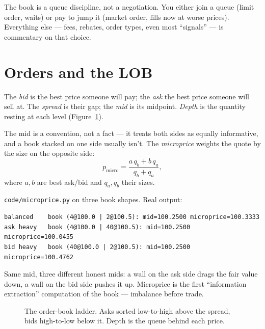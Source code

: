 The book is a queue discipline, not a negotiation. You either join a
queue (limit order, waits) or pay to jump it (market order, fills
now at worse prices). Everything else --- fees, rebates, order
types, even most ``signals'' --- is commentary on that choice.

\section{Orders and the LOB}\label{sec:orders}
The \emph{bid} is the best price someone will pay; the \emph{ask}
the best price someone will sell at. The \emph{spread} is their gap;
the \emph{mid} is its midpoint. \emph{Depth} is the quantity resting
at each level (Figure~\ref{fig:ladder}).

The mid is a convention, not a fact --- it treats both sides as
equally informative, and a book stacked on one side usually isn't.
The \emph{microprice} weights the quote by the size on the opposite
side:
\[
p_{\text{micro}}=\frac{a\,q_b + b\,q_a}{q_b+q_a},
\]
where $a,b$ are best ask/bid and $q_a,q_b$ their sizes.

\begin{example}\label{ex:microprice}
\texttt{code/microprice.py} on three book shapes. Real output:
\begin{lstlisting}[numbers=none]
balanced    book (4@100.0 | 2@100.5): mid=100.2500 microprice=100.3333
ask heavy   book (4@100.0 | 40@100.5): mid=100.2500 microprice=100.0455
bid heavy   book (40@100.0 | 2@100.5): mid=100.2500 microprice=100.4762
\end{lstlisting}
Same mid, three different honest mids: a wall on the ask side drags
the fair value down, a wall on the bid side pushes it up.
Microprice is the first ``information extraction'' computation of
the book --- imbalance before trade.
\end{example}

\begin{figure}[ht]\centering

\caption{The order-book ladder. Asks sorted low-to-high above the
spread, bids high-to-low below it. Depth is the queue behind each
price.}
\label{fig:ladder}
\end{figure}

